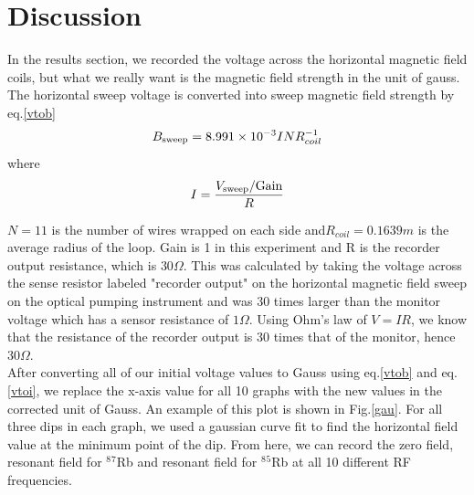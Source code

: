 \documentclass[prb,preprint]{revtex4-1}
\begin{document}
\section{Discussion}

In the results section, we recorded the voltage across the horizontal magnetic field coils, but what we really want is the magnetic field strength in the unit of gauss. The horizontal sweep voltage is converted into sweep magnetic field strength by eq.\ref{vtob}
\begin{equation}
B_{\textnormal{sweep}}=8.991\times10^{-3} I N R_{coil}^{-1}
\label{vtob}
\end{equation}
\vspace*{-0.25cm}
where
\vspace*{-0.5cm}
\begin{equation}
I=\frac{V_{\textnormal{sweep}}/{\textrm{Gain}}}{R}
\label{vtoi}
\end{equation}


$N=11$ is the number of wires wrapped on each side and$R_{coil}=0.1639m$ is the average radius of the loop. Gain is 1 in this experiment and R is the recorder output resistance, which is $30 \Omega$. This was calculated by taking the voltage across the sense resistor labeled "recorder output" on the horizontal magnetic field sweep on the optical pumping instrument and was 30 times larger than the monitor voltage which has a sensor resistance of $1 \Omega$. Using Ohm's law of $V=IR$, we know that the resistance of the recorder output is 30 times that of the monitor, hence $30 \Omega$.\\

After converting all of our initial voltage values to Gauss using eq.\ref{vtob} and eq.\ref{vtoi}, we replace the x-axis value for all 10 graphs with the new values in the corrected unit of Gauss. An example of this plot is shown in Fig.\ref{gau}. For all three dips in each graph, we used a gaussian curve fit to find the horizontal field value at the minimum point of the dip. From here, we can record the zero field, resonant field for $^8$$^7$Rb and resonant field for $^8$$^5$Rb at all 10 different RF frequencies.\\
\end{document}
